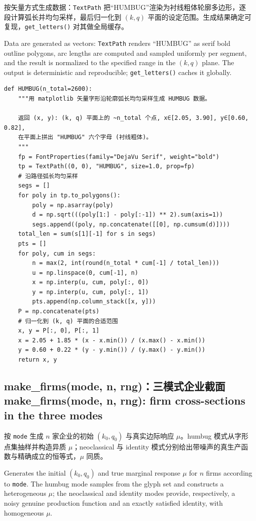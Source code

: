 \documentclass[12pt,a4paper]{ctexart}
\begin{document}
按矢量方式生成数据：\texttt{TextPath} 把“HUMBUG”渲染为衬线粗体轮廓多边形，逐段计算弧长并均匀采样，最后归一化到 $(k, q)$ 平面的设定范围。生成结果确定可复现，\texttt{get\_letters()} 对其做全局缓存。

Data are generated as vectors: \texttt{TextPath} renders “HUMBUG” as serif bold outline polygons, arc lengths are computed and sampled uniformly per segment, and the result is normalized to the specified range in the $(k,q)$ plane. The output is deterministic and reproducible; \texttt{get\_letters()} caches it globally.

\begin{lstlisting}[style=pycode]
def HUMBUG(n_total=2600):
    """用 matplotlib 矢量字形沿轮廓弧长均匀采样生成 HUMBUG 数据。

    返回 (x, y): (k, q) 平面上的 ~n_total 个点, x∈[2.05, 3.90], y∈[0.60, 0.82],
    在平面上拼出 "HUMBUG" 六个字母 (衬线粗体)。
    """
    fp = FontProperties(family="DejaVu Serif", weight="bold")
    tp = TextPath((0, 0), "HUMBUG", size=1.0, prop=fp)
    # 沿路径弧长均匀采样
    segs = []
    for poly in tp.to_polygons():
        poly = np.asarray(poly)
        d = np.sqrt(((poly[1:] - poly[:-1]) ** 2).sum(axis=1))
        segs.append((poly, np.concatenate([[0], np.cumsum(d)])))
    total_len = sum(s[1][-1] for s in segs)
    pts = []
    for poly, cum in segs:
        n = max(2, int(round(n_total * cum[-1] / total_len)))
        u = np.linspace(0, cum[-1], n)
        x = np.interp(u, cum, poly[:, 0])
        y = np.interp(u, cum, poly[:, 1])
        pts.append(np.column_stack([x, y]))
    P = np.concatenate(pts)
    # 归一化到 (k, q) 平面的合适范围
    x, y = P[:, 0], P[:, 1]
    x = 2.05 + 1.85 * (x - x.min()) / (x.max() - x.min())
    y = 0.60 + 0.22 * (y - y.min()) / (y.max() - y.min())
    return x, y
\end{lstlisting}

\subsection[make\_firms]{make\_firms(mode, n, rng)：三模式企业截面\\[1pt]\normalsize make\_firms(mode, n, rng): firm cross-sections in the three modes}

按 \texttt{mode} 生成 $n$ 家企业的初始 $(k_0, q_0)$ 与真实边际响应 $\mu$。humbug 模式从字形点集抽样并构造异质 $\mu$；neoclassical 与 identity 模式分别给出带噪声的真生产函数与精确成立的恒等式，$\mu$ 同质。

Generates the initial $(k_0,q_0)$ and true marginal response $\mu$ for $n$ firms according to \texttt{mode}. The humbug mode samples from the glyph set and constructs a heterogeneous $\mu$; the neoclassical and identity modes provide, respectively, a noisy genuine production function and an exactly satisfied identity, with homogeneous $\mu$.
\end{document}
